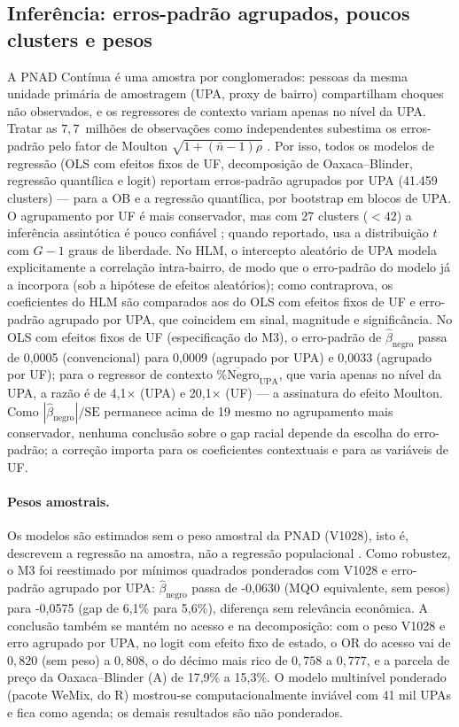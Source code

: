 \documentclass[11pt, a4paper, oneside]{article}
\begin{document}
\subsection*{Inferência: erros-padrão agrupados, poucos clusters e pesos}
\label{subsec:inferencia}

A PNAD Contínua é uma amostra por conglomerados: pessoas da mesma unidade primária de amostragem (UPA, proxy de bairro) compartilham choques não observados, e os regressores de contexto variam apenas no nível da UPA. Tratar as $7{,}7$~milhões de observações como independentes subestima os erros-padrão pelo fator de Moulton $\sqrt{1+(\bar n-1)\rho}$ \cite{angrist2009}. Por isso, todos os modelos de regressão (OLS com efeitos fixos de UF, decomposição de Oaxaca--Blinder, regressão quantílica e logit) reportam erros-padrão {agrupados por UPA} (41.459 clusters) --- para a OB e a regressão quantílica, por bootstrap em blocos de UPA. O agrupamento por UF é mais conservador, mas com 27 clusters ($<42$) a inferência assintótica é pouco confiável \cite{angrist2009}; quando reportado, usa a distribuição $t$ com $G-1$ graus de liberdade. No HLM, o intercepto aleatório de UPA modela explicitamente a correlação intra-bairro, de modo que o erro-padrão do modelo já a incorpora (sob a hipótese de efeitos aleatórios); como contraprova, os coeficientes do HLM são comparados aos do OLS com efeitos fixos de UF e erro-padrão agrupado por UPA, que coincidem em sinal, magnitude e significância. No OLS com efeitos fixos de UF (especificação do M3), o erro-padrão de $\hat\beta_{\text{negro}}$ passa de 0,0005 (convencional) para 0,0009 (agrupado por UPA) e 0,0033 (agrupado por UF); para o regressor de contexto $\overline{\%\text{Negro}}_{\text{UPA}}$, que varia apenas no nível da UPA, a razão é de 4,1$\times$ (UPA) e 20,1$\times$ (UF) --- a assinatura do efeito Moulton. Como $|\hat\beta_{\text{negro}}|/\text{SE}$ permanece acima de 19 mesmo no agrupamento mais conservador, nenhuma conclusão sobre o gap racial depende da escolha do erro-padrão; a correção importa para os coeficientes contextuais e para as variáveis de UF. 

\paragraph{Pesos amostrais.} Os modelos são estimados sem o peso amostral da PNAD (V1028), isto é, descrevem a regressão na amostra, não a regressão populacional \cite{angrist2009}. Como robustez, o M3 foi reestimado por mínimos quadrados ponderados com V1028 e erro-padrão agrupado por UPA: $\hat\beta_{\text{negro}}$ passa de -0,0630 (MQO equivalente, sem pesos) para -0,0575 (gap de 6,1\% para 5,6\%), diferença sem relevância econômica. A conclusão também se mantém no acesso e na decomposição: com o peso V1028 e erro agrupado por UPA, no logit com efeito fixo de estado, o OR do acesso vai de $0,820$ (sem peso) a $0,808$, o do décimo mais rico de $0,758$ a $0,777$, e a parcela de preço da Oaxaca--Blinder (A) de 17,9\% a 15,3\%. O modelo multinível ponderado (pacote WeMix, do R) mostrou-se computacionalmente inviável com 41 mil UPAs e fica como agenda; os demais resultados são não ponderados. 
\end{document}
